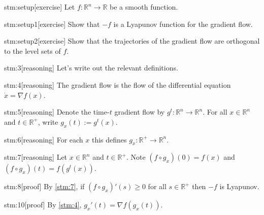 \documentclass{article}
\begin{document}

\begin{stm}{stm:setup}[exercise]
Let $f : \mathbb{R}^n \to \mathbb{R}$ be a smooth function. 
\end{stm}

\begin{stm}{stm:setup1}[exercise]
Show that $-f$ is a Lyapunov function for the gradient flow.
\end{stm}
    
\begin{stm}{stm:setup2}[exercise]
Show that the trajectories of the gradient flow are orthogonal to the level sets of $f$.
\end{stm}


\begin{stm}{stm:3}[reasoning]
Let's write out the relevant definitions.
\end{stm}

\begin{stm}{stm:4}[reasoning]
The gradient flow is the flow of the differential equation $\dot{x} = \nabla f(x)$.
\end{stm}

\begin{stm}{stm:5}[reasoning]
Denote the time-$t$ gradient flow by $g^t : \mathbb{R}^n \to \mathbb{R}^n$. For all $x \in \mathbb{R}^n$ and $t \in \mathbb{R}^+$, write $g_x(t) := g^t(x)$.
\end{stm}

\begin{stm}{stm:6}[reasoning]
For each $x$ this defines $g_x : \mathbb{R}^+ \to \mathbb{R}^n$.
\end{stm}

\begin{stm}{stm:7}[reasoning]
Let $x \in \mathbb{R}^n$ and $t \in \mathbb{R}^+$. Note $(f \circ g_x)(0) = f(x)$ and $(f \circ g_x)(t) = f(g^t(x))$.
\end{stm}

\begin{stm}{stm:8}[proof]
By \ref{stm:7}, if $(f \circ g_x)'(s) \ge 0$ for all $s \in \mathbb{R}^+$ then $-f$ is Lyapunov.
\end{stm}

\begin{stm}{stm:10}[proof]
By \ref{stm:4}, $g_x'(t) = \nabla f(g_x(t))$. 
\end{stm}
\end{document}
